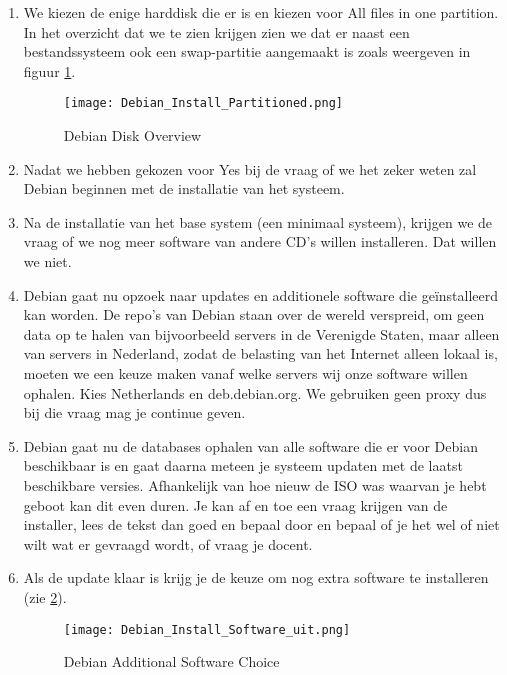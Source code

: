 \begin{enumerate}
\item We kiezen de enige harddisk die er is en kiezen voor All files in one partition. In het overzicht dat we te zien krijgen zien we dat er naast een bestandssysteem ook een swap-partitie aangemaakt is zoals weergeven in figuur \ref{DebDiskParts}.

\begin{figure}[H]
	\centering
	\texttt{[image: Debian\_Install\_Partitioned.png]}
	\caption{Debian Disk Overview}
	\label{DebDiskParts}
\end{figure}

\item Nadat we hebben gekozen voor Yes bij de vraag of we het zeker weten zal Debian beginnen met de installatie van het systeem.

\item Na de installatie van het base system (een minimaal systeem), krijgen we de vraag of we nog meer software van andere CD's willen installeren. Dat willen we niet.

\item Debian gaat nu opzoek naar updates en additionele software die ge\"installeerd kan worden. De repo's van Debian staan over de wereld verspreid, om geen data op te halen van bijvoorbeeld servers in de Verenigde Staten, maar alleen van servers in Nederland, zodat de belasting van het Internet alleen lokaal is, moeten we een keuze maken vanaf welke servers wij onze software willen ophalen. Kies Netherlands en deb.debian.org. We gebruiken geen proxy dus bij die vraag mag je continue geven.

\item Debian gaat nu de databases ophalen van alle software die er voor Debian beschikbaar is en gaat daarna meteen je systeem updaten met de laatst beschikbare versies. Afhankelijk van hoe nieuw de ISO was waarvan je hebt geboot kan dit even duren. Je kan af en toe een vraag krijgen van de installer, lees de tekst dan goed en bepaal door en bepaal of je het wel of niet wilt wat er gevraagd wordt, of vraag je docent.

\item Als de update klaar is krijg je de keuze om nog extra software te installeren (zie \ref{DebSoft}).

\begin{figure}[H]
	\centering
	\texttt{[image: Debian\_Install\_Software\_uit.png]}
	\caption{Debian Additional Software Choice}
	\label{DebSoft}
\end{figure}


\end{enumerate}
